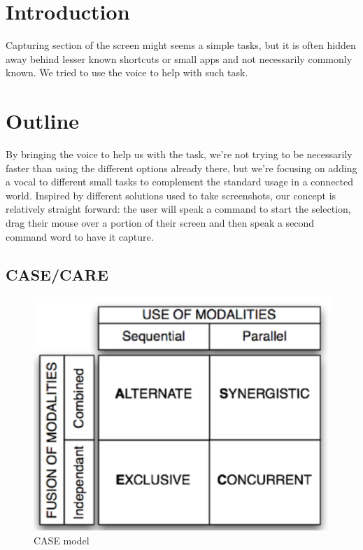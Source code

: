 \section{Introduction}

Capturing section of the screen might seems a simple tasks, but it is often hidden away behind lesser known shortcuts or small apps and not necessarily commonly known. We tried to use the voice to help with such task.

\section{Outline}

By bringing the voice to help us with the task, we're not trying to be necessarily faster than using the different options already there, but we're focusing on adding a vocal to different small tasks to complement the standard usage in a connected world.
Inspired by different solutions used to take screenshots, our concept is relatively straight forward: the user will speak a command to start the selection, drag their mouse over a portion of their screen and then speak a second command word to have it capture.

\subsection{CASE/CARE}
\begin{figure}
    \centering
    \includegraphics[scale=.6]{Report/images/CaseCare.png}
    \caption{CASE model}
    \label{fig:my_label}
\end{figure}

